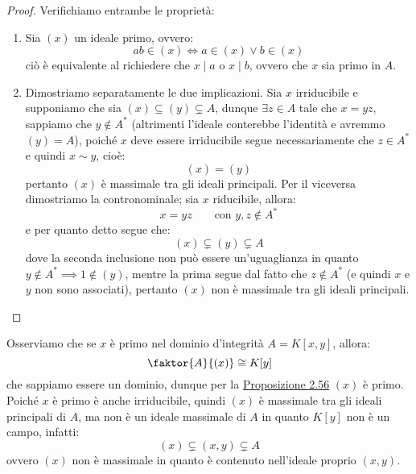 \documentclass[11pt]{scrartcl}
\begin{document}
\begin{proof}
    Verifichiamo entrambe le proprietà:
    \begin{enumerate}[(1)]
        \item Sia $(x)$ un ideale primo, ovvero:
            \[ ab \in (x) \iff a \in (x) \vee b \in (x)
                \]
        ciò è equivalente al richiedere che $x \mid a$ o $x \mid b$, ovvero che $x$ sia primo in $A$.
        \item Dimostriamo separatamente le due implicazioni. Sia $x$ irriducibile e supponiamo che sia $(x) \subseteq (y) \subsetneq A$,
            dunque $\exists z \in A$ tale che $x = yz$, sappiamo che $y \not \in A^*$ (altrimenti l'ideale conterebbe l'identità
            e avremmo $(y) = A$), poiché $x$ deve essere irriducibile segue necessariamente che $z \in A^*$ e quindi $x \sim y$, cioè:
            \[ (x) = (y)
                \]
            pertanto $(x)$ è massimale tra gli ideali principali. Per il viceversa dimostriamo la contronominale; sia $x$ riducibile, allora:
            \[ x = yz \qquad \text{con $y,z \not \in A^*$}
                \]
            e per quanto detto segue che:
            \[ (x) \subsetneq (y) \subsetneq A
                \]
            dove la seconda inclusione non può essere un'uguaglianza in quanto $y \not \in A^* \implies 1 \not \in (y)$, mentre la prima segue dal 
            fatto che $z \not \in A^*$ (e quindi $x$ e $y$ non sono associati), pertanto $(x)$ non è massimale tra gli ideali principali.
    \end{enumerate}
\end{proof}

\begin{example}
    Osserviamo che se $x$ è primo nel dominio d'integrità $A = K[x,y]$, allora:
    \[ \faktor{A}{(x)} \cong K[y]
        \]
    che sappiamo essere un dominio, dunque per la \hyperref[2.56]{Proposizione 2.56} $(x)$ è primo. Poiché $x$ è primo è anche irriducibile, quindi $(x)$
    è massimale tra gli ideali principali di $A$, ma non è un ideale massimale di $A$ in quanto $K[y]$ non è un campo, infatti:
    \[ (x) \subsetneq (x,y) \subsetneq A
        \]
    ovvero $(x)$ non è massimale in quanto è contenuto nell'ideale proprio $(x,y)$.
\end{example}

\newpage
\end{document}
